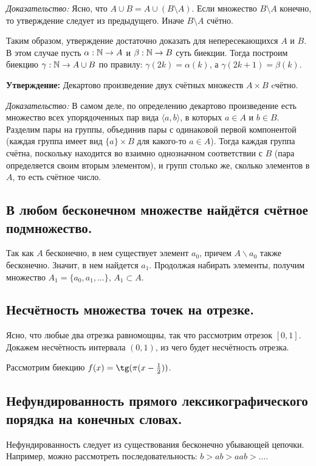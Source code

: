 \textit{Доказательство:} Ясно, что $A \cup B = A \cup (B \setminus A)$. Если множество $B \setminus A$ конечно, то утверждение следует из предыдущего. Иначе $B \setminus A$ счётно.

Таким образом, утверждение достаточно доказать для непересекающихся $A$ и $B$. В этом случае пусть $\alpha: \mathbb{N} \to A$ и $\beta : \mathbb{N} \to B$ суть биекции. Тогда построим биекцию $\gamma : \mathbb{N} \to A \cup B$ по правилу: $\gamma(2k) = \alpha(k)$, а $\gamma(2k + 1) = \beta(k)$.
    
\textbf{Утверждение:} Декартово произведение двух счётных множеств $A \times B$ cчётно.

\textit{Доказательство:} В самом деле, по определению декартово произведение есть множество всех упорядоченных пар вида $\langle a, b \rangle$, в которых $a \in A$ и $b \in B$. Разделим пары на группы, объединив пары с одинаковой первой компонентой (каждая группа имеет вид $\{a\}\times B$ для какого-то $a \in A$). Тогда каждая группа счётна, поскольку находится во взаимно однозначном соответствии с $B$ (пара определяется своим вторым элементом), и групп столько же, сколько элементов в $A$, то есть счётное число.

\subsection{В любом бесконечном множестве найдётся счётное подмножество.}
Так как $A$ бесконечно, в нем существует элемент $a_0$, причем $A\backslash{a_0}$ также бесконечно. Значит, в нем найдется $a_1$. Продолжая набирать элементы, получим множество $A_1 = \{a_0, a_1,\ldots\}$, $A_1 \subset A$.

\subsection{Несчётность множества точек на отрезке.}

Ясно, что любые два отрезка равномощны, так что рассмотрим отрезок $[0, 1]$. Докажем несчётность интервала $(0, 1)$, из чего будет несчётность отрезка.

Рассмотрим биекцию $f(x) = \tg(\pi(x - \frac{1}{2}))$.

\subsection{Нефундированность прямого лексикографического порядка на конечных словах.}
Нефундированность следует из существования бесконечно убывающей цепочки. Например, можно рассмотреть последовательность: $b > ab > aab > \ldots$.

